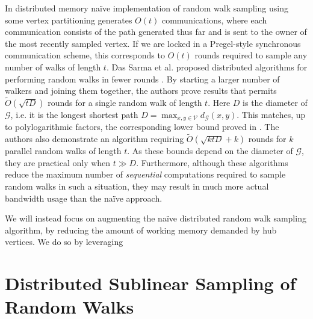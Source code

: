 \documentclass{report}
\begin{document}
In distributed memory na\"ive implementation of random walk sampling using some vertex partitioning generates $O(t)$ communications, where each communication consists of the path generated thus far and is sent to the owner of the most recently sampled vertex. 
If we are locked in a Pregel-style synchronous communication scheme, this corresponds to $O(t)$ rounds required to sample any number of walks of length $t$. 
Das Sarma et al. proposed distributed algorithms for performing random walks in fewer rounds \cite{das2013distributed}.
By starting a larger number of walkers and joining them together, the authors prove results that permits $\widetilde{O}(\sqrt{tD})$ rounds for a single random walk of length $t$.
Here $D$ is the diameter of $\mathcal{G}$, i.e. it is the longest shortest path $D = \max_{x, y \in \mathcal{V}} d_{\mathcal{G}}(x,y)$.
This matches, up to polylogarithmic factors, the corresponding lower bound proved in \cite{nanongkai2011tight}.
The authors also demonstrate an algorithm requiring $\widetilde{O}(\sqrt{ktD} + k)$ rounds for $k$ parallel random walks of length $t$.
As these bounds depend on the diameter of $\mathcal{G}$, they are practical only when $t \gg D$. 
Furthermore, although these algorithms reduce the maximum number of \emph{sequential} computations required to sample random walks in such a situation, they may result in much more actual bandwidth usage than the na\"ive approach. 

We will instead focus on augmenting the na\"ive distributed random walk sampling algorithm, by reducing the amount of working memory demanded by hub vertices.
We do so by leveraging




\section{Distributed Sublinear Sampling of Random Walks}
 \label{walks:sec:walks}
\end{document}
